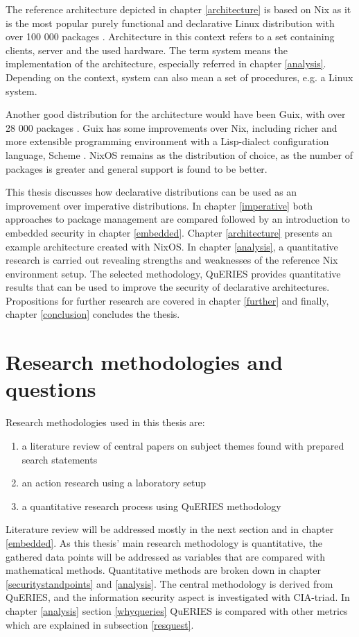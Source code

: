 The reference architecture depicted in chapter \ref{architecture} is
based on Nix as it is the most popular purely functional and declarative
Linux distribution with over 100 000 packages
\cite{nixosNixOSSearch}. Architecture in this context refers to a 
set containing clients, server and the used hardware. The term
system means the implementation of the architecture, especially
referred in chapter \ref{analysis}. Depending on the context, system
can also mean a set of procedures, e.g. a Linux system. 

Another good distribution for the architecture would have been Guix, with over
28 000 packages \cite{gnuPackagesx2014}. Guix has some improvements
over Nix, including richer and more extensible programming environment
with a Lisp-dialect configuration language, Scheme
\cite{courtes2021deploiements}. NixOS remains as the distribution of
choice, as the number of packages is greater and general support is
found to be better.

This thesis discusses how declarative distributions can be used as an
improvement over imperative distributions. In chapter \ref{imperative}
both approaches to package management are compared followed by an
introduction to embedded security in chapter \ref{embedded}. Chapter
\ref{architecture} presents an example architecture created with
NixOS. In chapter \ref{analysis}, a quantitative research is carried
out revealing strengths and weaknesses of the reference Nix
environment setup. The selected methodology, QuERIES provides
quantitative results that can be used to improve the security of
declarative architectures. Propositions for further research are
covered in chapter \ref{further} and finally, chapter \ref{conclusion}
concludes the thesis.

\section{Research methodologies and questions}

Research methodologies used in this thesis are:
\begin{enumerate}
\item a literature review of central papers on subject themes found
  with prepared search statements
\item an action research using a laboratory setup
\item a quantitative research process using QuERIES methodology
\end{enumerate}

Literature review will be addressed mostly in the next section and in
chapter \ref{embedded}. As this thesis' main research methodology is
quantitative, the gathered data points will be addressed as variables
that are compared with mathematical methods. Quantitative methods are
broken down in chapter \ref{securitystandpoints} and
\ref{analysis}. The central methodology is derived from QuERIES, and
the information security aspect is investigated with CIA-triad. In
chapter \ref{analysis} section \ref{whyqueries} QuERIES is compared
with other metrics which are explained in subsection \ref{resquest}.

